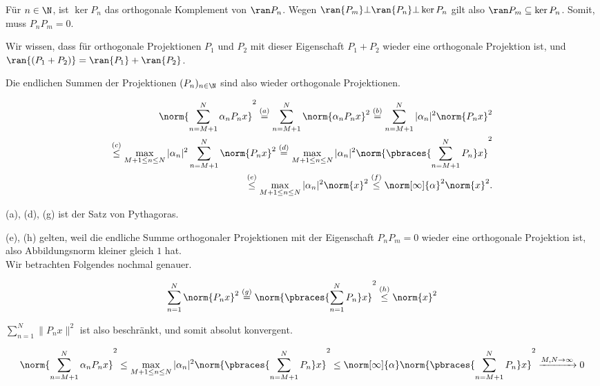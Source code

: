\begin{solution}

Für $n \in \N$, ist $\ker{P_n}$ das orthogonale Komplement von $\ran P_n$.
Wegen $\ran{P_m} \bot \ran{P_n} \bot \ker{P_n}$ gilt also $\ran P_m \subseteq \ker P_n$.
Somit, muss $P_n P_m = 0$.

Wir wissen, dass für orthogonale Projektionen $P_1$ und $P_2$ mit dieser Eigenschaft $P_1 + P_2$ wieder eine orthogonale Projektion ist, und $\ran{(P_1 + P_2)} = \ran{P_1} + \ran{P_2}$.

Die endlichen Summen der Projektionen $(P_n)_{n \in \N}$ sind also wieder orthogonale Projektionen.

\begin{align*}
    \norm{\sum_{n = M+1}^N \alpha_n P_n x}^2
    \stackrel{(a)}{=}
    \sum_{n = M+1}^N \norm{\alpha_n P_n x}^2
    \stackrel{(b)}{=}
    \sum_{n = M+1}^N |\alpha_n|^2 \norm{P_n x}^2 \\
    \stackrel{(c)}{\leq}
    \max_{M+1 \leq n \leq N} |\alpha_n|^2 \sum_{n = M+1}^N \norm{P_n x}^2
    \stackrel{(d)}{=}
    \max_{M+1 \leq n \leq N} |\alpha_n|^2 \norm{\pbraces{\sum_{n = M+1}^N P_n} x}^2 \\
    \stackrel{(e)}{\leq}
    \max_{M+1 \leq n \leq N} |\alpha_n|^2 \norm{x}^2
    \stackrel{(f)}{\leq}
    \norm[\infty]{\alpha}^2 \norm{x}^2.
\end{align*}

(a), (d), (g) ist der Satz von Pythagoras.

(e), (h) gelten, weil die endliche Summe orthogonaler Projektionen mit der Eigenschaft $P_n P_m = 0$ wieder eine orthogonale Projektion ist, also Abbildungsnorm kleiner gleich $1$ hat. \\

Wir betrachten Folgendes nochmal genauer.

\begin{align*}
    \sum_{n = 1}^N \norm{P_n x}^2
    \stackrel{(g)}{=}
    \norm{\pbraces{\sum_{n = 1}^N P_n} x}^2
    \stackrel{(h)}{\leq}
    \norm{x}^2
\end{align*}

$\sum_{n = 1}^N \| P_n x \|^2$ ist also beschränkt, und somit absolut konvergent.

\begin{align*}
  \norm{\sum_{n = M+1}^N \alpha_n P_n x}^2
  \leq
  \max_{M+1 \leq n \leq N} |\alpha_n|^2 \norm{\pbraces{\sum_{n = M+1}^N P_n} x}^2
  \leq
  \norm[\infty]{\alpha} \norm{\pbraces{\sum_{n = M+1}^N P_n} x}^2
  \xrightarrow{M, N \rightarrow \infty} 0
\end{align*}


\end{solution}
